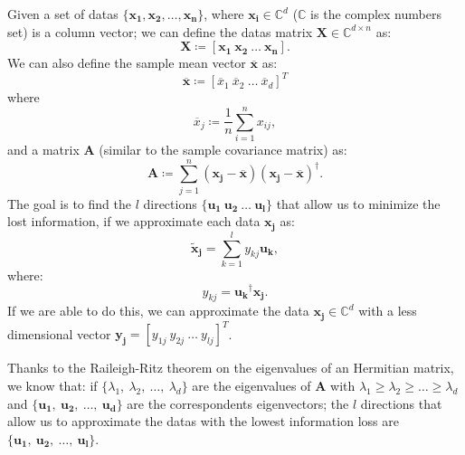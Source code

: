 \documentclass[%
    twoside, 
    a4paper
    ]{article}
\begin{document}
        Given a set of datas $\{ \bm{x_1}, \bm{x_2}, \dots, \bm{x_n}\}$, where 
        $ \bm{x_i} \in \mathbb{C}^d $ ($\mathbb{C}$ is the complex numbers set) is a column vector;
        we can define the datas matrix $\bm{X} \in \mathbb{C}^{d \times n}$ as:
        \begin{equation}
            \label{eq:data_matrix}
            \bm{X} \coloneqq \left[ \bm{x_1}\ \bm{x_2}\ \dots\ \bm{x_n} \right].
        \end{equation}
        We can also define the sample mean vector $\bm{\overline{x}}$ as:
        \begin{equation}
            \label{eq:mean_vector}
            \bm{\overline{x}} \coloneqq \left[ \overline{x}_1\ \overline{x}_2\ \dots\ \overline{x}_d \right]^{T}
        \end{equation}
        where 
        \begin{equation*}
            \overline{x}_j \coloneqq \frac{1}{n} \sum_{i=1}^{n} x_{ij},
        \end{equation*}
        and a matrix $\bm{A}$ (similar to the sample covariance matrix) as:
        \begin{equation}
            \label{eq:covariance_matrix}
            \bm{A} \coloneqq \sum_{j=1}^{n} \left( \bm{x_j} - \bm{\overline{x}} \right)
            \left( \bm{x_j} - \bm{\overline{x}} \right)^\dagger.
        \end{equation}
        The goal is to find the $l$ directions $\{ \bm{u_1}\ \bm{u_2}\ \dots\ \bm{u_l} \}$ that
        allow us to minimize the lost information,
        if we approximate each data $\bm{x_j}$ as:
        \begin{equation}
            \label{eq:reconstructed data}
            \bm{\tilde{x}_j} = \sum_{k=1}^l y_{kj} \bm{u_k},
        \end{equation}
        where:
        \begin{equation*}
            y_{kj} = \bm{u_k}^\dagger \bm{x_j}.
        \end{equation*}
        If we are able to do this, we can approximate the data $\bm{x_j} \in \mathbb{C}^d$ with a
        less dimensional vector $\bm{y_j} = \left[ y_{1j}\ y_{2j}\ \dots\ y_{lj} \right]^T $.
        
        Thanks to the Raileigh-Ritz theorem on the eigenvalues of an Hermitian matrix, we
        know that: if $\{ \lambda_1,\ \lambda_2,\ \dots,\ \lambda_d \} $ are the eigenvalues
        of $\bm{A}$ with $ \lambda_1 \geq \lambda_2 \geq \dots \geq \lambda_d $ and 
        $\{ \bm{u_1},\ \bm{u_2},\ \dots,\ \bm{u_d} \}$ are the correspondents eigenvectors; 
        the $l$ directions that allow us to approximate the datas with the lowest information loss
        are $\{ \bm{u_1},\ \bm{u_2},\ \dots,\ \bm{u_l} \}$.
\end{document}

